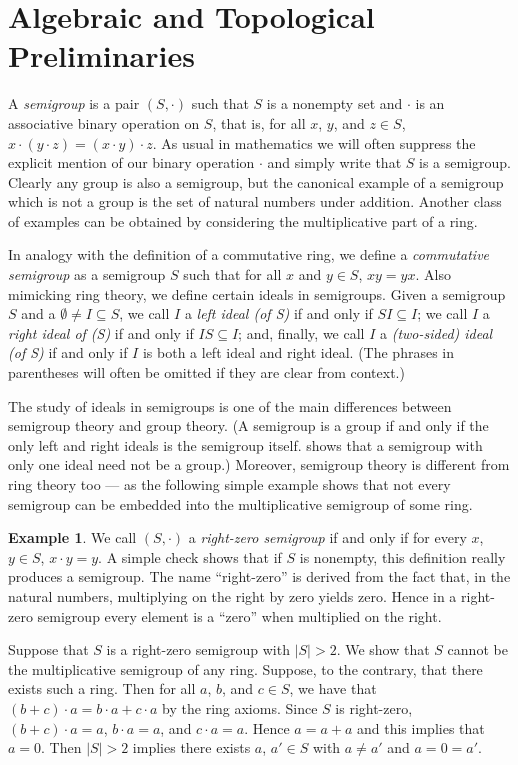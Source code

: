 \documentclass[12pt]{article}
\theoremstyle{plain}
\theoremstyle{definition}
\newtheorem{example}[thm]{Example}
\begin{document}
\section{Algebraic and Topological Preliminaries}
A \textsl{semigroup} is a pair $(S, \cdot)$ such that $S$ is a
nonempty set and $\cdot$ is an associative binary operation on $S$,
that is, for all $x$, $y$, and $z \in S$, $x \cdot (y \cdot z) = (x
\cdot y) \cdot z$.
As usual in mathematics we will often suppress the explicit mention of
our binary operation $\cdot$ and simply write that $S$ is a semigroup.
Clearly any group is also a semigroup, but the canonical
example of a semigroup which is not a group is the set of
natural numbers under addition.
Another class of examples can be obtained by considering the
multiplicative part of a ring. 

In analogy with the definition of a commutative ring, we define a
\textsl{commutative semigroup} as a semigroup $S$ such that for all
$x$ and $y \in S$, $xy = yx$.
Also mimicking ring theory, we define certain ideals in semigroups.
Given a semigroup $S$ and a $\emptyset \ne I \subseteq S$, we call $I$
a \textsl{left ideal (of S)} if and only if $SI \subseteq I$; we call
$I$ a \textsl{right ideal of (S)} if and only if $IS \subseteq I$;
and, finally, we call $I$ a \textsl{(two-sided) ideal (of S)} if and
only if $I$ is both a left ideal and right ideal.
(The phrases in parentheses will often be omitted if they are clear
from context.)

The study of ideals in semigroups is one of the main differences
between semigroup theory and group theory.
(A semigroup is a group if and only if the only left and right ideals
is the semigroup itself.
\cite[Example 1.28]{Hindman:1998fk} shows that a semigroup with only
one ideal need not be a group.)
Moreover, semigroup theory is different from ring theory too --- as the
following simple example shows that not every semigroup can be
embedded into the multiplicative semigroup of some ring.

\begin{example}
  We call $(S, \cdot)$ a \textsl{right-zero semigroup} if and only if
  for every $x$, $y \in S$, $x \cdot y = y$.
  A simple check shows that if $S$ is nonempty, this definition really
  produces a semigroup.
  The name ``right-zero'' is derived from the fact that, in the
  natural numbers, multiplying on the right by zero yields zero.
  Hence in a right-zero semigroup every element is a ``zero'' when
  multiplied on the right.

  Suppose that $S$ is a right-zero semigroup with $|S| > 2$. 
  We show that $S$ cannot be the multiplicative semigroup of any
  ring. 
  Suppose, to the contrary, that there exists such a ring.
  Then for all $a$, $b$, and $c \in S$, we have that $(b+c) \cdot a =
  b \cdot a + c \cdot a$ by the ring axioms.
  Since $S$ is right-zero, $(b+c) \cdot a = a$, $b \cdot a = a$, and
  $c \cdot a = a$.
  Hence $a = a + a$ and this implies that $a = 0$. 
  Then $|S| > 2$ implies there exists $a$, $a' \in S$ with $a \ne a'$
  and $a = 0 = a'$.
\end{example}
\end{document}
